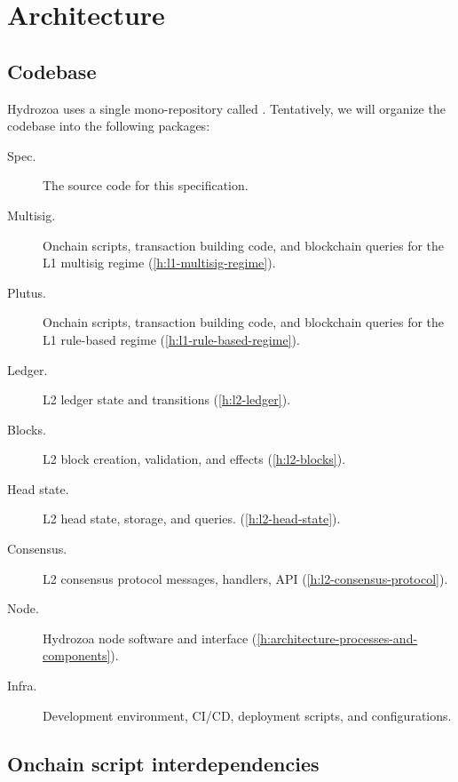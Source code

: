 \documentclass[../hydrozoa.tex]{subfiles}
\begin{document}
\chapter{Architecture}%
\label{h:architecture}%

\section{Codebase}%
\label{h:architecture-codebase}%

Hydrozoa uses a single mono-repository called  \citep{FlerovskyRodionovHydrozoaRepositoryGithub2025}.
Tentatively, we will organize the codebase into the following packages:
\begin{description}
  \item[Spec.] The source code for this specification.
  \item[Multisig.] Onchain scripts, transaction building code, and blockchain queries for the L1 multisig regime (\cref{h:l1-multisig-regime}).
  \item[Plutus.] Onchain scripts, transaction building code, and blockchain queries for the L1 rule-based regime (\cref{h:l1-rule-based-regime}).
  \item[Ledger.] L2 ledger state and transitions (\cref{h:l2-ledger}).
  \item[Blocks.] L2 block creation, validation, and effects (\cref{h:l2-blocks}).
  \item[Head state.] L2 head state, storage, and queries. (\cref{h:l2-head-state}).
  \item[Consensus.] L2 consensus protocol messages, handlers, API (\cref{h:l2-consensus-protocol}).
  \item[Node.] Hydrozoa node software and interface (\cref{h:architecture-processes-and-components}).
  \item[Infra.] Development environment, CI/CD, deployment scripts, and configurations.
\end{description}

\section{Onchain script interdependencies}%
\label{h:ref}%
\end{document}
